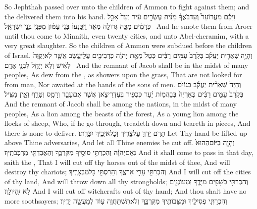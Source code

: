 {So Jephthah passed over unto the children of Ammon to fight against them; and the \lord\space delivered them into his hand.}
{וַיַּכֵּ֡ם מֵעֲרוֹעֵר֩ וְעַד\maqqaf בֹּאֲךָ֨ מִנִּ֜ית עֶשְׂרִ֣ים עִ֗יר וְעַד֙ אָבֵ֣ל כְּרָמִ֔ים מַכָּ֖ה גְּדוֹלָ֣ה מְאֹ֑ד וַיִּכָּֽנְעוּ֙ בְּנֵ֣י עַמּ֔וֹן מִפְּנֵ֖י בְּנֵ֥י יִשְׂרָאֵֽל׃ \petucha }
{And he smote them from Aroer until thou come to Minnith, even twenty cities, and unto Abel-cheramim, with a very great slaughter. So the children of Ammon were subdued before the children of Israel.}
\label{haft_40}
\setcounter{chap}{5}
\setcounter{verse}{6}
{וְהָיָ֣ה \legarmeh  שְׁאֵרִ֣ית יַעֲקֹ֗ב בְּקֶ֙רֶב֙ עַמִּ֣ים רַבִּ֔ים כְּטַל֙ מֵאֵ֣ת יְהֹוָ֔ה כִּרְבִיבִ֖ים עֲלֵי\maqqaf עֵ֑שֶׂב אֲשֶׁ֤ר לֹֽא\maqqaf יְקַוֶּה֙ לְאִ֔ישׁ וְלֹ֥א יְיַחֵ֖ל לִבְנֵ֥י אָדָֽם׃ \petucha }
{And the remnant of Jacob shall be in the midst of many peoples, As dew from the \lord, as showers upon the grass, That are not looked for from man, Nor awaited at the hands of the sons of men.}
{וְהָיָה֩ שְׁאֵרִ֨ית יַעֲקֹ֜ב בַּגּוֹיִ֗ם בְּקֶ֙רֶב֙ עַמִּ֣ים רַבִּ֔ים כְּאַרְיֵה֙ בְּבַהֲמ֣וֹת יַ֔עַר כִּכְפִ֖יר בְּעֶדְרֵי\maqqaf צֹ֑אן אֲשֶׁ֧ר אִם\maqqaf עָבַ֛ר וְרָמַ֥ס וְטָרַ֖ף וְאֵ֥ין מַצִּֽיל׃}
{And the remnant of Jacob shall be among the nations, in the midst of many peoples, As a lion among the beasts of the forest, As a young lion among the flocks of sheep, Who, if he go through, treadeth down and teareth in pieces, And there is none to deliver.}
{תָּרֹ֥ם יָדְךָ֖ עַל\maqqaf צָרֶ֑יךָ וְכׇל\maqqaf אֹיְבֶ֖יךָ יִכָּרֵֽתוּ׃}
{Let Thy hand be lifted up above Thine adversaries, And let all Thine enemies be cut off.}
{וְהָיָ֤ה בַיּוֹם\maqqaf הַהוּא֙ נְאֻם\maqqaf יְהֹוָ֔ה וְהִכְרַתִּ֥י סוּסֶ֖יךָ מִקִּרְבֶּ֑ךָ וְהַאֲבַדְתִּ֖י מַרְכְּבֹתֶֽיךָ׃}
{And it shall come to pass in that day, saith the \lord, That I will cut off thy horses out of the midst of thee, And will destroy thy chariots;}
{וְהִכְרַתִּ֖י עָרֵ֣י אַרְצֶ֑ךָ וְהָרַסְתִּ֖י כׇּל\maqqaf מִבְצָרֶֽיךָ׃}
{And I will cut off the cities of thy land, And will throw down all thy strongholds;}
{וְהִכְרַתִּ֥י כְשָׁפִ֖ים מִיָּדֶ֑ךָ וּֽמְעוֹנְנִ֖ים לֹ֥א יִֽהְיוּ\maqqaf לָֽךְ׃}
{And I will cut off witchcrafts out of thy hand; And thou shalt have no more soothsayers;}
{וְהִכְרַתִּ֧י פְסִילֶ֛יךָ וּמַצֵּבוֹתֶ֖יךָ מִקִּרְבֶּ֑ךָ וְלֹא\maqqaf תִשְׁתַּחֲוֶ֥ה ע֖וֹד לְמַעֲשֵׂ֥ה יָדֶֽיךָ׃}
